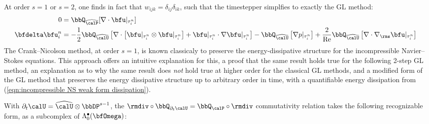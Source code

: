 \begin{example}
        At order $s = 1$ or $s = 2$, one finds in fact that $w_{ijk} = \delta_{ij}\delta_{ik}$, such that the timestepper simplfies to exactly the GL method:
        \begin{align}
                               0  &=  \bbQ_{\widehat{\calP}}[\nabla\cdot\bfu|_{\tau^{n}_{i}}]  \\
            \bfdelta\bfu^{n}_{i}  &=  - \frac{1}{2}\bbQ_{\widehat{\calU}}\left[\nabla\cdot\left[\bfu|_{\tau^{n}_{i}}\otimes\bfu|_{\tau^{n}_{i}}\right] + \bfu|_{\tau^{n}_{i}}\cdot\nabla\bfu|_{\tau^{n}_{i}}\right] - \bbQ_{\widehat{\calU}}\left[\nabla p|_{\tau^{n}_{i}}\right] + \frac{2}{\rmRe}\bbQ_{\widehat{\calU}}\left[\nabla\cdot\nabla_{\rms}\bfu|_{\tau^{n}_{i}}\right]
        \end{align}
        The Crank--Nicolson method, at order $s = 1$, is known classicaly to preserve the energy-dissipative structure for the incompressible Navier--Stokes equations. \BA{[Ref]} This approach offers an intuitive explanation for this, a proof that the same result holds true for the following 2-step GL method, an explanation as to why the same result does \emph{not} hold true at higher order for the classical GL methods, and a modified form of the GL method that preserves the energy dissipative structure up to arbitrary order in time, with a quantifiable energy dissipation from (\ref{eqn:incompressible NS weak form dissipation}).
        
        With $\partial_{t}\calU = \widehat{\calU}\otimes\bbDP^{s - 1}$, the $\rmdiv\circ\bbQ_{\partial_{t}\calU} = \bbQ_{\calP}\circ\rmdiv$ commutativity relation takes the following recognizable form, as a subcomplex of $\Lambda_{0}^{\bullet}(\bfOmega)$:
        \begin{center}\end{center}
    \end{example}
